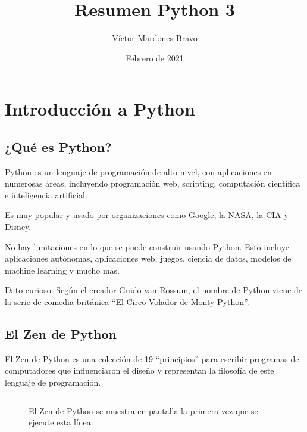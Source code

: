 \documentclass{article}
\title{Resumen Python 3}
\author{Víctor Mardones Bravo}
\date{Febrero de 2021}
\newcommand{\doble}[1]{``#1''}
\begin{document}

\null
\nointerlineskip
\vfill
\let\snewpage \newpage
\let\newpage \relax
  {\centering\def\svgwidth{\columnwidth}
  }
\maketitle
\let \newpage \snewpage
\vfill 
\break

\newpage


\section{Introducción a Python}

\subsection{¿Qué es Python?}

Python es un lenguaje de programación de alto nivel, con aplicaciones en numerosas áreas, incluyendo programación web, scripting, computación científica e inteligencia artificial.

Es muy popular y usado por organizaciones como Google, la NASA, la CIA y Disney.

No hay limitaciones en lo que se puede construir usando Python. Esto incluye aplicaciones autónomas, aplicaciones web, juegos, ciencia de datos, modelos de machine learning y mucho más.

Dato curioso: Según el creador Guido van Rossum, el nombre de Python viene de la serie de comedia británica \doble{El Circo Volador de Monty Python}.

\subsection{El Zen de Python}

El Zen de Python es una colección de 19 \doble{principios} para escribir programas de computadores que influenciaron el diseño y representan la filosofía de este lenguaje de programación.

\begin{figure}[ht!]
  \inputminted[frame=single, linenos]{python}{codigo/cap1/import_this.py}
  \caption{El Zen de Python se muestra en pantalla la primera vez que se ejecute esta línea.}
\end{figure}
\end{document}
